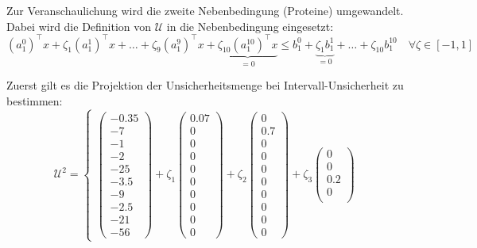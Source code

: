 \documentclass[a4paper,12pt]{article}
\begin{document}
Zur Veranschaulichung wird die zweite Nebenbedingung (Proteine) umgewandelt.
Dabei wird die Definition von $\mathcal{U}$ in die Nebenbedingung eingesetzt:
\[
(a_1^0)^\top x + \zeta_1 (a_1^1)^\top x + \dots + \zeta_9 (a_1^9)^\top x + \underbrace{\zeta_{10} (a_1^{10})^\top x}_{= 0} \leq b_1^0 + \underbrace{\zeta_1 b_1^1}_{=0} + \dots +\zeta_{10} b_1^{10} \quad \forall \zeta \in [-1, 1]
\]

Zuerst gilt es die Projektion der Unsicherheitsmenge bei Intervall-Unsicherheit zu bestimmen:
\[
\mathcal{U}^{2} = \left\{ 
\begin{array}{l}
    \begin{pmatrix}
    -0.35 \\ 
    -7 \\ 
    -1 \\
    -2 \\
    -25 \\
    -3.5 \\
    -9 \\
    -2.5 \\
    -21 \\
    -56
    \end{pmatrix}
    + \zeta_1 
    \begin{pmatrix}
    0.07 \\ 
    0 \\ 
    0 \\
    0 \\
    0 \\
    0 \\
    0 \\
    0 \\
    0 \\
    0
    \end{pmatrix}
    + \zeta_2 
    \begin{pmatrix}
    0 \\ 
    0.7 \\ 
    0 \\
    0 \\
    0 \\
    0 \\
    0 \\
    0 \\
    0 \\
    0
    \end{pmatrix}
    + \zeta_3 
    \begin{pmatrix}
    0 \\ 
    0 \\ 
    0.2 \\
    0 \\ 

\end{pmatrix}
\end{array}\]
\end{document}
